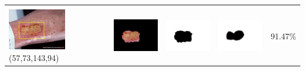 \begin{table}[H]
\begin{tabular}{|m{1.0in}|m{1.0in}|m{1.0in}|m{1.0in}|m{0.6in}|}
		
		&  &  & \\
		\includegraphics[width=1.0in]{gambar/hasil_segmentasi/luka_kuning/image_3_rect.jpg} {\centering\fontsize{10}{10}\selectfont(57,73,143,94)}&
		\includegraphics[width=1.0in]{gambar/hasil_segmentasi/luka_kuning/result_3.jpg}&
		\includegraphics[width=1.0in]{gambar/hasil_segmentasi/luka_kuning/mask_r_3.jpg}&
		\includegraphics[width=1.0in]{gambar/hasil_segmentasi/luka_kuning/3_r.jpg}&
		91.47\% \\
		\hline

	\end{tabular}
\end{table}


